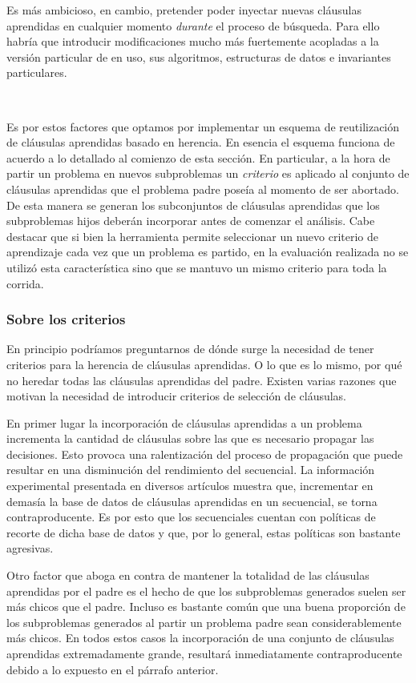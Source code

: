 Es más ambicioso, en cambio, pretender poder inyectar nuevas cláusulas
aprendidas en cualquier momento \emph{durante} el proceso de búsqueda. Para
ello habría que introducir modificaciones mucho más fuertemente acopladas a la
versión particular de \ssolver en uso, sus algoritmos, estructuras de datos e
invariantes particulares.

\

Es por estos factores que optamos por implementar un esquema de reutilización
de cláusulas aprendidas basado en herencia. En esencia el esquema funciona de
acuerdo a lo detallado al comienzo de esta sección. En particular, a la hora
de partir un problema en nuevos subproblemas un \emph{criterio} es aplicado al
conjunto de cláusulas aprendidas que el problema padre poseía al momento de
ser abortado. De esta manera se generan los subconjuntos de cláusulas
aprendidas que los subproblemas hijos deberán incorporar antes de comenzar el
análisis. Cabe destacar que si bien la herramienta permite seleccionar un
nuevo criterio de aprendizaje cada vez que un problema es partido, en la
evaluación realizada no se utilizó esta característica sino que se mantuvo un
mismo criterio para toda la corrida.


\subsubsection{Sobre los criterios}

En principio podríamos preguntarnos de dónde surge la necesidad de tener
criterios para la herencia de cláusulas aprendidas. O lo que es lo mismo, por
qué no heredar todas las cláusulas aprendidas del padre. Existen varias
razones que motivan la necesidad de introducir criterios de selección de
cláusulas.

En primer lugar la incorporación de cláusulas aprendidas a un problema
incrementa la cantidad de cláusulas sobre las que es necesario propagar las
decisiones. Esto provoca una ralentización del proceso de propagación que
puede resultar en una disminución del rendimiento del \ssolver secuencial. La
información experimental presentada en diversos artículos muestra que,
incrementar en demasía la base de datos de cláusulas aprendidas en un \ssolver
secuencial, se torna contraproducente. Es por esto que los \ssolvers
secuenciales cuentan con políticas de recorte de dicha base de datos y que,
por lo general, estas políticas son bastante agresivas.

Otro factor que aboga en contra de mantener la totalidad de las cláusulas
aprendidas por el padre es el hecho de que los subproblemas generados suelen
ser más chicos que el padre. Incluso es bastante común que una buena
proporción de los subproblemas generados al partir un problema padre sean
considerablemente más chicos. En todos estos casos la incorporación de una
conjunto de cláusulas aprendidas extremadamente grande, resultará
inmediatamente contraproducente debido a lo expuesto en el párrafo anterior.

